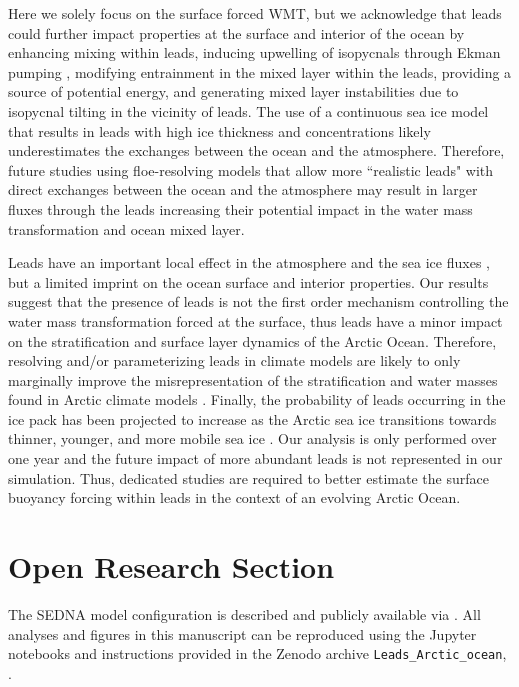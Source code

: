 \documentclass[draft]{agujournal2019}
\begin{document}
Here we solely focus on the surface forced WMT, but we acknowledge that leads could further impact properties at the surface and interior of the ocean by enhancing mixing within leads, inducing upwelling of isopycnals through Ekman pumping \cite{McPhee_LKF_2005}, modifying entrainment in the mixed layer within the leads, providing a source of potential energy, and generating mixed layer instabilities due to isopycnal tilting in the vicinity of leads. The use of a continuous sea ice model that results in leads with high ice thickness and concentrations likely underestimates the exchanges between the ocean and the atmosphere. Therefore, future studies using floe-resolving models that allow more ``realistic leads" with direct exchanges between the ocean and the atmosphere may result in larger fluxes through the leads increasing their potential impact in the water mass transformation and ocean mixed layer.

Leads have an important local effect in the atmosphere and the sea ice fluxes \cite{Marcq_flux_lead_2012, Lupkes_leads_2008, Wettlaufer_insulator_1997, Smith_polynyas_1990}, but a limited imprint on the ocean surface and interior properties. Our results suggest that the presence of leads is not the first order mechanism controlling the water mass transformation forced at the surface, thus leads have a minor impact on the stratification and surface layer dynamics of the Arctic Ocean.
Therefore, resolving and/or parameterizing leads in climate models are likely to only marginally improve the misrepresentation of the stratification and water masses found in Arctic climate models \cite{Wang_ompi_2024,Ilicak_core_2016}. Finally, the probability of leads occurring in the ice pack has been projected to increase as the Arctic sea ice transitions towards thinner, younger, and more mobile sea ice \cite{Boutin_rheology_2023, IPCC_arctic_2022}. Our analysis is only performed over one year and the future impact of more abundant leads is not represented in our simulation. Thus, dedicated studies are required to better estimate the surface buoyancy forcing within leads in the context of an evolving Arctic Ocean.


%
%

\section*{Open Research Section}
The SEDNA model configuration is described and publicly available via .
All analyses and figures in this manuscript can be reproduced using the Jupyter notebooks and instructions provided in the Zenodo archive \texttt{Leads\_Arctic\_ocean}, .
\end{document}
